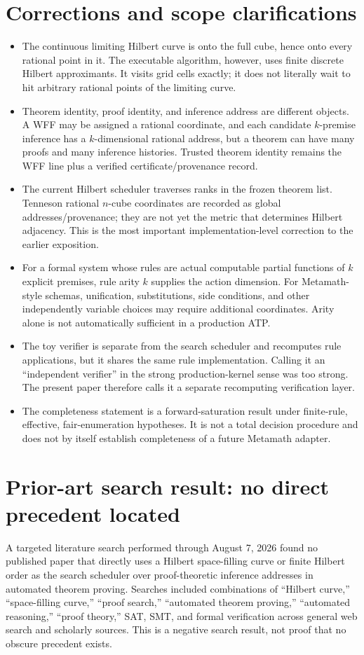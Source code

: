 \documentclass[11pt]{article}
\theoremstyle{hilberttheorem}
\newcommand{\tocsection}[2]{%
  \Needspace{6\baselineskip}%
  \phantomsection
  \addcontentsline{toc}{section}{#1}%
  \section*{#1}%
  \label{#2}%
}
\begin{document}
\tocsection{Corrections and scope clarifications}{corrections-v030}
\begin{itemize}
\item The continuous limiting Hilbert curve is onto the full cube, hence onto every rational point in it. The executable algorithm, however, uses finite discrete Hilbert approximants. It visits grid cells exactly; it does not literally wait to hit arbitrary rational points of the limiting curve.
\item Theorem identity, proof identity, and inference address are different objects. A WFF may be assigned a rational coordinate, and each candidate $k$-premise inference has a $k$-dimensional rational address, but a theorem can have many proofs and many inference histories. Trusted theorem identity remains the WFF line plus a verified certificate/provenance record.
\item The current Hilbert scheduler traverses ranks in the frozen theorem list. Tenneson rational $n$-cube coordinates are recorded as global addresses/provenance; they are not yet the metric that determines Hilbert adjacency. This is the most important implementation-level correction to the earlier exposition.
\item For a formal system whose rules are actual computable partial functions of $k$ explicit premises, rule arity $k$ supplies the action dimension. For Metamath-style schemas, unification, substitutions, side conditions, and other independently variable choices may require additional coordinates. Arity alone is not automatically sufficient in a production ATP.
\item The toy verifier is separate from the search scheduler and recomputes rule applications, but it shares the same rule implementation. Calling it an ``independent verifier'' in the strong production-kernel sense was too strong. The present paper therefore calls it a separate recomputing verification layer.
\item The completeness statement is a forward-saturation result under finite-rule, effective, fair-enumeration hypotheses. It is not a total decision procedure and does not by itself establish completeness of a future Metamath adapter.
\end{itemize}

\section{Prior-art search result: no direct precedent located}\label{sec:prior-art}
A targeted literature search performed through August 7, 2026 found no published paper that directly uses a Hilbert space-filling curve or finite Hilbert order as the search scheduler over proof-theoretic inference addresses in automated theorem proving. Searches included combinations of ``Hilbert curve,'' ``space-filling curve,'' ``proof search,'' ``automated theorem proving,'' ``automated reasoning,'' ``proof theory,'' SAT, SMT, and formal verification across general web search and scholarly sources. This is a negative search result, not proof that no obscure precedent exists.
\end{document}
